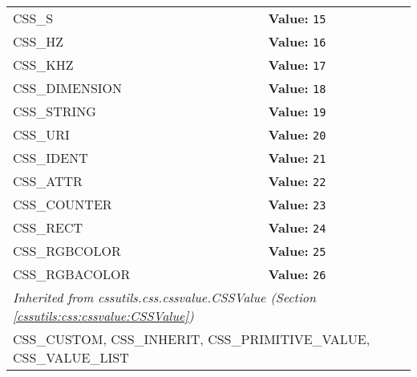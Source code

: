 \begin{longtable}{|p{\varnamewidth}|p{\vardescrwidth}|l}
\cline{1-2}
\raggedright C\-S\-S\-\_\-S\- & \raggedright \textbf{Value:} 
{\tt 15}&\\
\cline{1-2}
\raggedright C\-S\-S\-\_\-H\-Z\- & \raggedright \textbf{Value:} 
{\tt 16}&\\
\cline{1-2}
\raggedright C\-S\-S\-\_\-K\-H\-Z\- & \raggedright \textbf{Value:} 
{\tt 17}&\\
\cline{1-2}
\raggedright C\-S\-S\-\_\-D\-I\-M\-E\-N\-S\-I\-O\-N\- & \raggedright \textbf{Value:} 
{\tt 18}&\\
\cline{1-2}
\raggedright C\-S\-S\-\_\-S\-T\-R\-I\-N\-G\- & \raggedright \textbf{Value:} 
{\tt 19}&\\
\cline{1-2}
\raggedright C\-S\-S\-\_\-U\-R\-I\- & \raggedright \textbf{Value:} 
{\tt 20}&\\
\cline{1-2}
\raggedright C\-S\-S\-\_\-I\-D\-E\-N\-T\- & \raggedright \textbf{Value:} 
{\tt 21}&\\
\cline{1-2}
\raggedright C\-S\-S\-\_\-A\-T\-T\-R\- & \raggedright \textbf{Value:} 
{\tt 22}&\\
\cline{1-2}
\raggedright C\-S\-S\-\_\-C\-O\-U\-N\-T\-E\-R\- & \raggedright \textbf{Value:} 
{\tt 23}&\\
\cline{1-2}
\raggedright C\-S\-S\-\_\-R\-E\-C\-T\- & \raggedright \textbf{Value:} 
{\tt 24}&\\
\cline{1-2}
\raggedright C\-S\-S\-\_\-R\-G\-B\-C\-O\-L\-O\-R\- & \raggedright \textbf{Value:} 
{\tt 25}&\\
\cline{1-2}
\raggedright C\-S\-S\-\_\-R\-G\-B\-A\-C\-O\-L\-O\-R\- & \raggedright \textbf{Value:} 
{\tt 26}&\\
\cline{1-2}
\multicolumn{2}{|l|}{\textit{Inherited from cssutils.css.cssvalue.CSSValue \textit{(Section \ref{cssutils:css:cssvalue:CSSValue})}}}\\
\multicolumn{2}{|p{\varwidth}|}{\raggedright CSS\_CUSTOM, CSS\_INHERIT, CSS\_PRIMITIVE\_VALUE, CSS\_VALUE\_LIST}\\
\cline{1-2}
\end{longtable}

